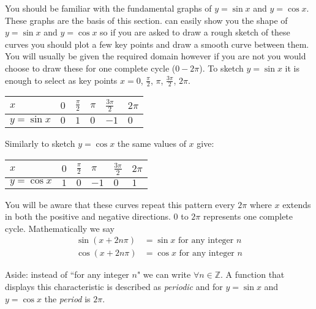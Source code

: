 You should be familiar with the fundamental graphs of $y =\sin  x$ and $y =\cos  x$. These graphs are the basis of this section. \Desmos can easily show you the shape of $y =\sin  x$ and $y =\cos  x$ so if you are asked to draw a rough sketch of these curves you should plot a few key points and draw a smooth curve between them. You will usually be given the required domain however if you are not you would choose to draw these for one complete cycle ($0 -2 \pi $). To sketch $y =\sin  x$ it is enough to select as key points $x =0$, $\frac{\pi }{2}$, $\pi $, $\frac{3 \pi }{2}$, $2 \pi $. 


\begin{tabular}[c]{|l|l|l|l|l|l|}\hline
	$x$  & $0$  & $\frac{\pi }{2}$  & $\pi $  & $\frac{3 \pi }{2}$  & $2 \pi $  \\
	\hline
	$y =\sin  x$  & $0$  & $1$  & $0$  & $ -1$  & $0$  \\
	\hline
\end{tabular}

Similarly to sketch $y =\cos x$ the same values of $x$ give: 


\begin{tabular}[c]{|l|l|l|l|l|l|}\hline
	$x$  & $0$  & $\frac{\pi }{2}$  & $\pi $  & $\frac{3 \pi }{2}$  & $2 \pi $  \\
	\hline
	$y =\cos  x$  & $1$  & $0$  & $ -1$  & $0$  & $1$  \\
	\hline
\end{tabular}

You will be aware that these curves repeat this pattern every $2 \pi $ where $x$ extends in both the positive and negative directions. $0$ to $2\pi $ represents one complete cycle. Mathematically we say
\begin{align*}\sin  \left (x +2 n \pi \right ) &  = \sin  x\text{\  for any integer }n \\
	\cos  \left (x +2 n \pi \right ) &  = \cos  x\text{\  for any integer }n\end{align*}

Aside: instead of ``for any integer $n$" we can write $ \forall n \in \mathbb{Z}$. A function that displays this characteristic is described as \emph{periodic} and for $y =\sin x$ and $y =\cos x$ the \emph{period} is $2 \pi $. 


